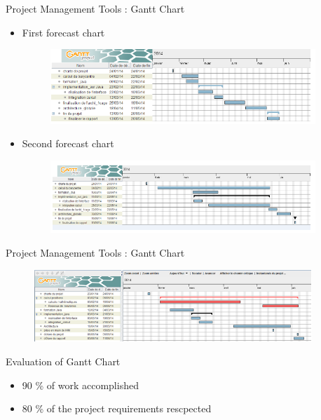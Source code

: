 \documentclass[utf8,compress]{beamer}
\begin{document}
\begin{frame}{Project Management Tools : Gantt Chart}
\begin{itemize}
    \item First forecast chart
 \begin{figure}[h]
        \includegraphics[width=10cm]{ganttb.png}
    \end{figure}
    \item Second forecast chart
 \begin{figure}[h]
        \includegraphics[width=10cm]{gantta.png}
    \end{figure}
\end{itemize}

\end{frame}
\begin{frame}{Project Management Tools : Gantt Chart}
 \begin{figure}[htb]
        \includegraphics[width=10.5cm]{ganttc.png}
    \end{figure}
\begin{block}{Evaluation of Gantt Chart}
\begin{itemize}
    \item   90  \% of work accomplished
 \item      80 \% of the project requirements rescpected
\end{itemize}
\end{block}

\end{frame}



\end{document}
